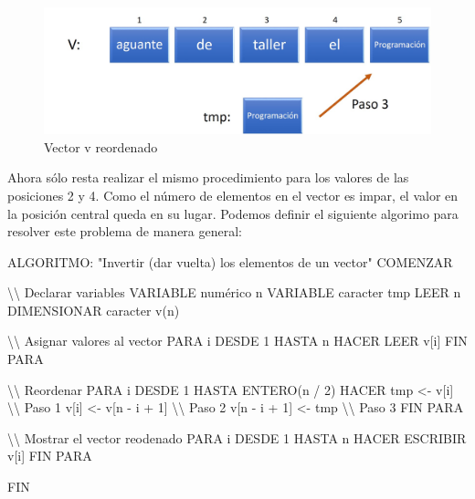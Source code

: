 \documentclass[
]{book}
\newenvironment{Shaded}{\begin{snugshade}}{\end{snugshade}}
\newcommand{\NormalTok}[1]{#1}
\begin{document}
\begin{figure}

{\centering \includegraphics[width=0.8\linewidth]{images/18_invertir} 

}

\caption{Vector v reordenado}\label{fig:inv5}
\end{figure}

Ahora sólo resta realizar el mismo procedimiento para los valores de las posiciones 2 y 4. Como el número de elementos en el vector es impar, el valor en la posición central queda en su lugar. Podemos definir el siguiente algorimo para resolver este problema de manera general:

\begin{Shaded}
\begin{Highlighting}[]
\NormalTok{ALGORITMO: "Invertir (dar vuelta) los elementos de un vector"}
\NormalTok{COMENZAR}
    
\NormalTok{    \textbackslash{}\textbackslash{} Declarar variables}
\NormalTok{    VARIABLE numérico n}
\NormalTok{    VARIABLE caracter tmp}
\NormalTok{    LEER n}
\NormalTok{    DIMENSIONAR caracter v(n)}
    
\NormalTok{    \textbackslash{}\textbackslash{} Asignar valores al vector}
\NormalTok{    PARA i DESDE 1 HASTA n HACER}
\NormalTok{        LEER v[i]}
\NormalTok{    FIN PARA}
    
\NormalTok{    \textbackslash{}\textbackslash{} Reordenar}
\NormalTok{    PARA i DESDE 1 HASTA ENTERO(n / 2) HACER}
\NormalTok{        tmp \textless{}{-} v[i]                 \textbackslash{}\textbackslash{} Paso 1}
\NormalTok{        v[i] \textless{}{-} v[n {-} i + 1]        \textbackslash{}\textbackslash{} Paso 2}
\NormalTok{        v[n {-} i + 1] \textless{}{-} tmp         \textbackslash{}\textbackslash{} Paso 3}
\NormalTok{    FIN PARA}
    
\NormalTok{    \textbackslash{}\textbackslash{} Mostrar el vector reodenado}
\NormalTok{    PARA i DESDE 1 HASTA n HACER}
\NormalTok{        ESCRIBIR v[i]}
\NormalTok{    FIN PARA}
    
\NormalTok{FIN}
\end{Highlighting}
\end{Shaded}
\end{document}
